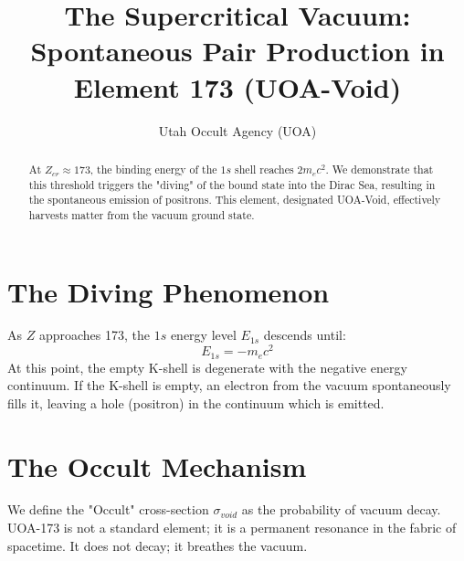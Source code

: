 \documentclass[11pt, reqno]{amsart}
\title[Vacuum Decay at Z=173]{The Supercritical Vacuum: Spontaneous Pair Production in Element 173 (UOA-Void)}
\author{Utah Occult Agency (UOA)}
\begin{document}
\maketitle

\begin{abstract}
At $Z_{cr} \approx 173$, the binding energy of the $1s$ shell reaches $2m_e c^2$. We demonstrate that this threshold triggers the "diving" of the bound state into the Dirac Sea, resulting in the spontaneous emission of positrons. This element, designated UOA-Void, effectively harvests matter from the vacuum ground state.
\end{abstract}

\section{The Diving Phenomenon}
As $Z$ approaches 173, the $1s$ energy level $E_{1s}$ descends until:
\begin{equation}
    E_{1s} = -m_e c^2
\end{equation}
At this point, the empty K-shell is degenerate with the negative energy continuum. If the K-shell is empty, an electron from the vacuum spontaneously fills it, leaving a hole (positron) in the continuum which is emitted.

\section{The Occult Mechanism}
We define the "Occult" cross-section $\sigma_{void}$ as the probability of vacuum decay. UOA-173 is not a standard element; it is a permanent resonance in the fabric of spacetime. It does not decay; it breathes the vacuum.
\end{document}
